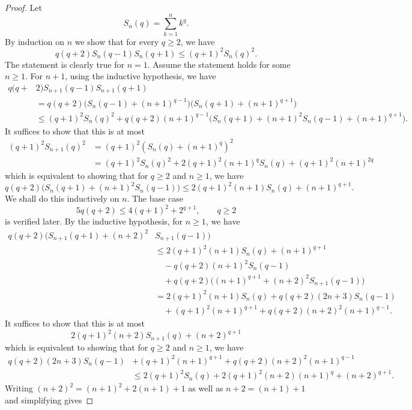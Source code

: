 \documentclass[10pt]{article}
\newcommand{\1}{\textbf{1}}
\theoremstyle{remark}
\theoremstyle{definition}
\begin{document}
\begin{proof}
Let
\[
S_n(q) = \sum_{k=1}^n k^q.
\]
By induction on $n$ we show that for every $q \geq 2$, we have
\[
q(q+2)S_{n}(q-1)S_n(q+1) \leq (q+1)^2S_n(q)^2.
\] 
The statement is clearly true for $n=1$. Assume the statement holds for some $n \geq 1$. For $n+1$, using the inductive hypothesis, we have
\begin{align*}
q(q+&2)S_{n+1}(q-1)S_{n+1}(q+1) \\
&= q(q+2)\Big(S_n(q-1)+(n+1)^{q-1}\Big)\Big(S_n(q+1)+(n+1)^{q+1}\Big) \\
&\leq (q+1)^2S_n(q)^2 + q(q+2)(n+1)^{q-1}\Big(S_n(q+1) + (n+1)^2S_n(q-1) + (n+1)^{q+1}\Big).
\end{align*}
It suffices to show that this is at most 
\begin{align*}
(q+1)^2S_{n+1}(q)^2 &= (q+1)^2(S_n(q)+(n+1)^{q})^2\\
&= (q+1)^2S_n(q)^2 + 2(q+1)^2(n+1)^qS_n(q) + (q+1)^2(n+1)^{2q}
\end{align*}
which is equivalent to showing that for $q \geq 2$ and $n \geq 1$, we have
\[
q(q+2)\Big(S_n(q+1) + (n+1)^2S_n(q-1)\Big) \leq 2( q+1)^2(n+1)S_n(q) + (n+1)^{q+1}.
\]
We shall do this inductively on $n$. The base case
\begin{equation}\label{eq:ind2-base}
5q(q+2) \leq 4(q+1)^2 + 2^{q+1}, \qquad q \geq 2
\end{equation}
is verified later. By the inductive hypothesis, for $n \geq 1$, we have
\begin{align*}
q(q+2)\Big(S_{n+1}(q+1) + (n+2)^2&S_{n+1}(q-1)\Big) \\
&\leq 2(q+1)^2(n+1)S_{n}(q) + (n+1)^{q+1} \\
&\quad- q(q+2)(n+1)^2S_{n}(q-1) \\
&\quad+ q(q+2)\Big((n+1)^{q+1}+(n+2)^2S_{n+1}(q-1)\Big) \\
&=2(q+1)^2(n+1)S_n(q) + q(q+2)(2n+3)S_{n}(q-1) \\
&\quad+ (q+1)^2(n+1)^{q+1} + q(q+2)(n+2)^2(n+1)^{q-1}.
\end{align*}
It suffices to show that this is at most 
\[
2( q+1)^2(n+2)S_{n+1}(q) + (n+2)^{q+1}
\]
which is equivalent to showing that for $q \geq 2$ and $n \geq 1$, we have
\begin{align*}
q(q+2)(2n+3)S_{n}(q-1) &+ (q+1)^2(n+1)^{q+1} + q(q+2)(n+2)^2(n+1)^{q-1} \\
&\leq 2(q+1)^2S_{n}(q) + 2(q+1)^2(n+2)(n+1)^q + (n+2)^{q+1}.
\end{align*}
Writing $(n+2)^2 = (n+1)^2 + 2(n+1) + 1$ as well as $n+2 = (n+1)+1$ and simplifying gives

\end{proof}
\end{document}
